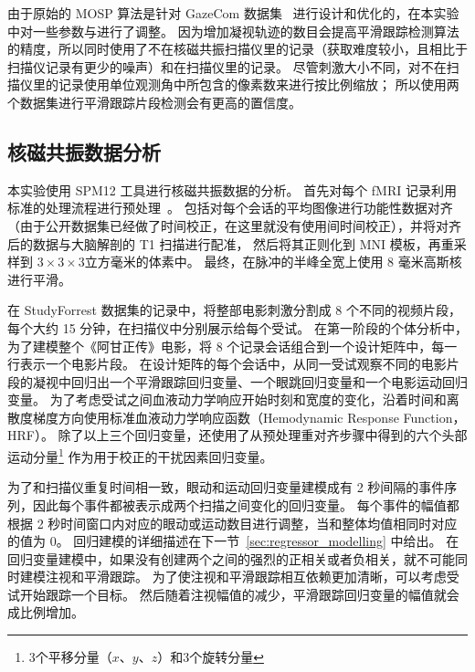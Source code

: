由于原始的 MOSP 算法是针对 GazeCom 数据集~\cite{var_natural} 进行设计和优化的，在本实验中对一些参数与进行了调整。
因为增加凝视轨迹的数目会提高平滑跟踪检测算法的精度，所以同时使用了不在核磁共振扫描仪里的记录（获取难度较小，且相比于扫描仪记录有更少的噪声）和在扫描仪里的记录。
尽管刺激大小不同，对不在扫描仪里的记录使用单位观测角中所包含的像素数来进行按比例缩放；
所以使用两个数据集进行平滑跟踪片段检测会有更高的置信度。


\subsection{核磁共振数据分析}
本实验使用 SPM12 工具进行核磁共振数据的分析。
首先对每个 fMRI 记录利用标准的处理流程进行预处理~\cite{mri_analysis}。
包括对每个会话的平均图像进行功能性数据对齐（由于公开数据集已经做了时间校正，在这里就没有使用间时间校正），并将对齐后的数据与大脑解剖的 T1 扫描进行配准，
然后将其正则化到 MNI 模板，再重采样到 $3 \times 3 \times 3$立方毫米的体素中。
最终，在脉冲的半峰全宽上使用 8 毫米高斯核进行平滑。

在 StudyForrest 数据集的记录中，将整部电影刺激分割成 8 个不同的视频片段，每个大约 15 分钟，在扫描仪中分别展示给每个受试。
在第一阶段的个体分析中，
为了建模整个《阿甘正传》电影，将 8 个记录会话组合到一个设计矩阵中，每一行表示一个电影片段。
在设计矩阵的每个会话中，从同一受试观察不同的电影片段的凝视中回归出一个平滑跟踪回归变量、一个眼跳回归变量和一个电影运动回归变量。
为了考虑受试之间血液动力学响应开始时刻和宽度的变化，沿着时间和离散度梯度方向使用标准血液动力学响应函数（Hemodynamic Response Function，HRF）。
除了以上三个回归变量，还使用了从预处理重对齐步骤中得到的六个头部运动分量\footnote{3个平移分量（$x$、$y$、$z$）和3个旋转分量} 作为用于校正的干扰因素回归变量。

为了和扫描仪重复时间相一致，眼动和运动回归变量建模成有 2 秒间隔的事件序列，因此每个事件都被表示成两个扫描之间变化的回归变量。
每个事件的幅值都根据 2 秒时间窗口内对应的眼动或运动数目进行调整，当和整体均值相同时对应的值为 0。
回归建模的详细描述在下一节~\ref{sec:regressor_modelling} 中给出。
在回归变量建模中，如果没有创建两个之间的强烈的正相关或者负相关，就不可能同时建模注视和平滑跟踪。
为了使注视和平滑跟踪相互依赖更加清晰，可以考虑受试开始跟踪一个目标。
然后随着注视幅值的减少，平滑跟踪回归变量的幅值就会成比例增加。

